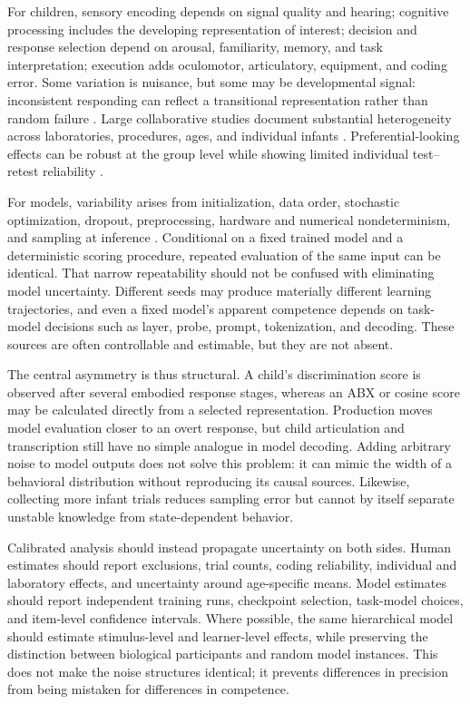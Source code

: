 For children, sensory encoding depends on signal quality and hearing; cognitive processing includes the developing representation of interest; decision and response selection depend on arousal, familiarity, memory, and task interpretation; execution adds oculomotor, articulatory, equipment, and coding error. Some variation is nuisance, but some may be developmental signal: inconsistent responding can reflect a transitional representation rather than random failure \citep{Mitchell2022,kucharsky2024habituation}. Large collaborative studies document substantial heterogeneity across laboratories, procedures, ages, and individual infants \citep{ManyBabies2020}. Preferential-looking effects can be robust at the group level while showing limited individual test--retest reliability \citep{Monroy2021,DeBolt2020,byers2022six,schreiner2024limited}.

For models, variability arises from initialization, data order, stochastic optimization, dropout, preprocessing, hardware and numerical nondeterminism, and sampling at inference \citep{srivastava_dropout_2014,dodge2020fine,summers2021nondeterminism}. Conditional on a fixed trained model and a deterministic scoring procedure, repeated evaluation of the same input can be identical. That narrow repeatability should not be confused with eliminating model uncertainty. Different seeds may produce materially different learning trajectories, and even a fixed model's apparent competence depends on task-model decisions such as layer, probe, prompt, tokenization, and decoding. These sources are often controllable and estimable, but they are not absent.

The central asymmetry is thus structural. A child's discrimination score is observed after several embodied response stages, whereas an ABX or cosine score may be calculated directly from a selected representation. Production moves model evaluation closer to an overt response, but child articulation and transcription still have no simple analogue in model decoding. Adding arbitrary noise to model outputs does not solve this problem: it can mimic the width of a behavioral distribution without reproducing its causal sources. Likewise, collecting more infant trials reduces sampling error but cannot by itself separate unstable knowledge from state-dependent behavior.

Calibrated analysis should instead propagate uncertainty on both sides. Human estimates should report exclusions, trial counts, coding reliability, individual and laboratory effects, and uncertainty around age-specific means. Model estimates should report independent training runs, checkpoint selection, task-model choices, and item-level confidence intervals. Where possible, the same hierarchical model should estimate stimulus-level and learner-level effects, while preserving the distinction between biological participants and random model instances. This does not make the noise structures identical; it prevents differences in precision from being mistaken for differences in competence.


